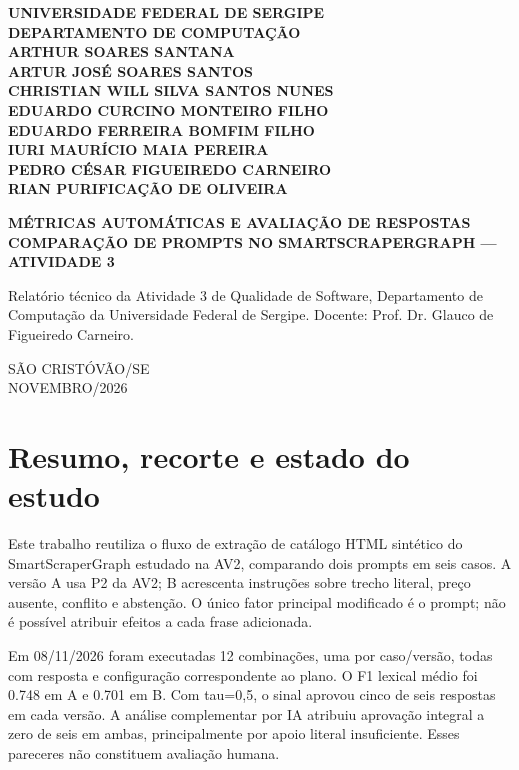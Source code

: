 \documentclass[a4paper,12pt]{article}
\begin{document}
\onehalfspacing
\begin{titlepage}\thispagestyle{empty}\begin{center}
\textbf{UNIVERSIDADE FEDERAL DE SERGIPE}\\
\textbf{DEPARTAMENTO DE COMPUTAÇÃO}\\[1cm]
\textbf{ARTHUR SOARES SANTANA\\ARTUR JOSÉ SOARES SANTOS\\CHRISTIAN WILL SILVA SANTOS NUNES\\EDUARDO CURCINO MONTEIRO FILHO\\EDUARDO FERREIRA BOMFIM FILHO\\IURI MAURÍCIO MAIA PEREIRA\\PEDRO CÉSAR FIGUEIREDO CARNEIRO\\RIAN PURIFICAÇÃO DE OLIVEIRA}
\vspace{1.3cm}

\textbf{\Large MÉTRICAS AUTOMÁTICAS E AVALIAÇÃO DE RESPOSTAS}\\[0.4cm]
\textbf{COMPARAÇÃO DE PROMPTS NO SMARTSCRAPERGRAPH --- ATIVIDADE 3}
\end{center}\vspace{1cm}
\begin{flushright}\begin{minipage}{0.65\textwidth}
Relatório técnico da Atividade 3 de Qualidade de Software, Departamento de Computação da Universidade Federal de Sergipe. Docente: Prof. Dr. Glauco de Figueiredo Carneiro.
\end{minipage}\end{flushright}
\vfill\begin{center}SÃO CRISTÓVÃO/SE\\NOVEMBRO/2026\end{center}\end{titlepage}
\tableofcontents\clearpage{}

\section{Resumo, recorte e estado do estudo}
Este trabalho reutiliza o fluxo de extração de catálogo HTML sintético do SmartScraperGraph estudado na AV2, comparando dois prompts em seis casos. A versão A usa P2 da AV2; B acrescenta instruções sobre trecho literal, preço ausente, conflito e abstenção. O único fator principal modificado é o prompt; não é possível atribuir efeitos a cada frase adicionada.

Em 08/11/2026 foram executadas 12 combinações, uma por caso/versão, todas com resposta e configuração correspondente ao plano. O F1 lexical médio foi 0.748 em A e 0.701 em B. Com tau=0,5, o sinal aprovou cinco de seis respostas em cada versão. A análise complementar por IA atribuiu aprovação integral a zero de seis em ambas, principalmente por apoio literal insuficiente. Esses pareceres não constituem avaliação humana.
\end{document}
